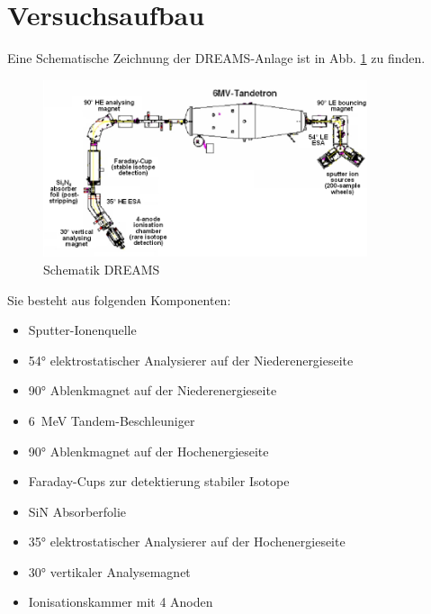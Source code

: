 \section{Versuchsaufbau}
Eine Schematische Zeichnung der DREAMS-Anlage ist in Abb. \ref{Auswertung_Bild_DREAMS} zu finden.
\begin{figure}[ht]
	\centering
    \includegraphics[width=0.85\textwidth]{Pictures/DREAMS.png}
	\caption{Schematik DREAMS \cite{Bild_DREAMS}}
	\label{Auswertung_Bild_DREAMS}
\end{figure}
Sie besteht aus folgenden Komponenten:
\begin{itemize}
    \item Sputter-Ionenquelle
    \item \ang{54} elektrostatischer Analysierer auf der Niederenergieseite
    \item \ang{90} Ablenkmagnet auf der Niederenergieseite
    \item \SI{6}{\mega\electronvolt} Tandem-Beschleuniger
    \item \ang{90} Ablenkmagnet auf der Hochenergieseite
    \item Faraday-Cups zur detektierung stabiler Isotope
    \item SiN Absorberfolie
    \item \ang{35} elektrostatischer Analysierer auf der Hochenergieseite
    \item \ang{30} vertikaler Analysemagnet
    \item Ionisationskammer mit 4 Anoden
\end{itemize} %
